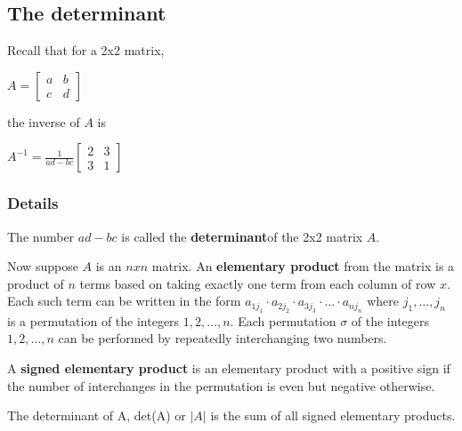 \documentclass[12pt,a4paper]{article}
\theoremstyle{regla}
\theoremstyle{remark}
\theoremstyle{definition}
\theoremstyle{nonumberbreak}
\begin{document}
\subsection{The determinant}
\begin{fbox}
\begin{minipage}{0.97\textwidth}
Recall that for a 2x2 matrix, 

$A=
\begin{bmatrix}
a & b  \\
c & d 
\end{bmatrix}$

the inverse of $A$ is 

$A^{-1}=
\frac{1}{ad-bc}
\begin{bmatrix}
2 & 3  \\
3 & 1 
\end{bmatrix}$
\end{minipage}
\end{fbox}
\subsubsection{Details}
\begin{defn}
The number $ad-bc$ is called the {\bf determinant}of the 2x2 matrix $A$.
\end{defn}
\begin{defn}
Now suppose $A$ is an $n x n$ matrix. An {\bf elementary product} from the matrix is a product of $n$ terms based on taking  exactly one term from each column of row $x$. Each such term can be written in the form 
$a_{1j_1} \cdot a_{2j_2} \cdot a_{3j_3} \cdot \ldots \cdot a_{nj_n}$
where $j_1, \ldots , j_n$ is a permutation of the integers $1,2, \ldots , n$. Each permutation $\sigma$ of the integers $1,2,\ldots,n$ can be performed by repeatedly interchanging two numbers. 
\end{defn}

\begin{defn}
A {\bf signed elementary product} is an elementary product with a positive sign if the number of interchanges in the permutation is even but negative otherwise.
\end{defn}

The determinant of A, det(A) or $\vert A \vert$ is the sum of all signed elementary products.
\end{document}
